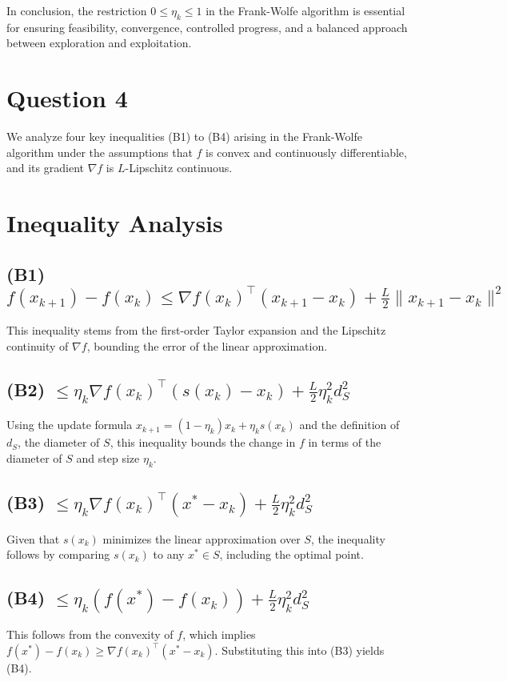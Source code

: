 \documentclass[12p]{article}
\begin{document}
In conclusion, the restriction \( 0 \leq \eta_k \leq 1 \) in the Frank-Wolfe algorithm is essential for ensuring feasibility, convergence, controlled progress, and a balanced approach between exploration and exploitation.


\section*{Question 4} 

We analyze four key inequalities (B1) to (B4) arising in the Frank-Wolfe algorithm under the assumptions that \( f \) is convex and continuously differentiable, and its gradient \( \nabla f \) is \( L \)-Lipschitz continuous.

\section*{Inequality Analysis}

\subsection*{(B1) \( f(x_{k+1}) - f(x_k) \leq \nabla f(x_k)^\top (x_{k+1} - x_k) + \frac{L}{2} \|x_{k+1} - x_k\|^2 \)}
This inequality stems from the first-order Taylor expansion and the Lipschitz continuity of \( \nabla f \), bounding the error of the linear approximation.

\subsection*{(B2) \( \leq \eta_k \nabla f(x_k)^\top (s(x_k) - x_k) + \frac{L}{2} \eta_k^2 d_S^2 \)}
Using the update formula \( x_{k+1} = (1 - \eta_k)x_k + \eta_k s(x_k) \) and the definition of \( d_S \), the diameter of \( S \), this inequality bounds the change in \( f \) in terms of the diameter of \( S \) and step size \( \eta_k \).

\subsection*{(B3) \( \leq \eta_k \nabla f(x_k)^\top (x^* - x_k) + \frac{L}{2} \eta_k^2 d_S^2 \)}
Given that \( s(x_k) \) minimizes the linear approximation over \( S \), the inequality follows by comparing \( s(x_k) \) to any \( x^* \in S \), including the optimal point.

\subsection*{(B4) \( \leq \eta_k (f(x^*) - f(x_k)) + \frac{L}{2} \eta_k^2 d_S^2 \)}
This follows from the convexity of \( f \), which implies \( f(x^*) - f(x_k) \geq \nabla f(x_k)^\top (x^* - x_k) \). Substituting this into (B3) yields (B4).
\end{document}
